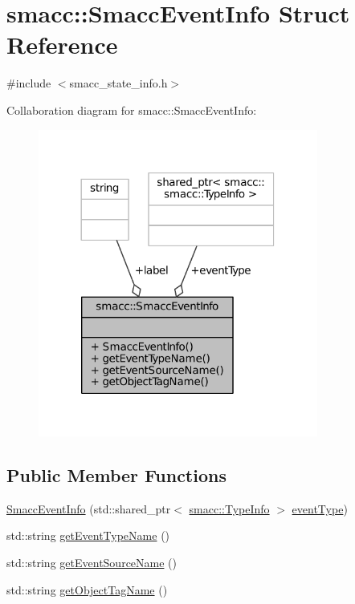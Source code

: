 \hypertarget{structsmacc_1_1SmaccEventInfo}{}\section{smacc\+:\+:Smacc\+Event\+Info Struct Reference}
\label{structsmacc_1_1SmaccEventInfo}


{\ttfamily \#include $<$smacc\+\_\+state\+\_\+info.\+h$>$}



Collaboration diagram for smacc\+:\+:Smacc\+Event\+Info\+:
\nopagebreak
\begin{figure}[H]
\begin{center}
\leavevmode
\includegraphics[width=260pt]{structsmacc_1_1SmaccEventInfo__coll__graph}
\end{center}
\end{figure}
\subsection*{Public Member Functions}
\begin{DoxyCompactItemize}
\item 
\hyperlink{structsmacc_1_1SmaccEventInfo_adb157317435016e17767e984f912ca7e}{Smacc\+Event\+Info} (std\+::shared\+\_\+ptr$<$ \hyperlink{classsmacc_1_1TypeInfo}{smacc\+::\+Type\+Info} $>$ \hyperlink{structsmacc_1_1SmaccEventInfo_a42df97fc9a9a817ca841427358002930}{event\+Type})
\item 
std\+::string \hyperlink{structsmacc_1_1SmaccEventInfo_ae0ed6a9506dbe526269a0bd956a71044}{get\+Event\+Type\+Name} ()
\item 
std\+::string \hyperlink{structsmacc_1_1SmaccEventInfo_af9e90a557f8f62069a17234f79bcefa0}{get\+Event\+Source\+Name} ()
\item 
std\+::string \hyperlink{structsmacc_1_1SmaccEventInfo_a0aa5d15822e7642079f375ee0f4ff096}{get\+Object\+Tag\+Name} ()
\end{DoxyCompactItemize}
